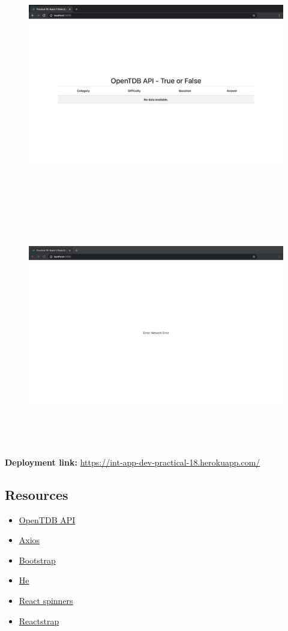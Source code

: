 \documentclass{article}
\begin{document}
\begin{figure}[H]
  \includegraphics[width=175mm, height=105mm]{./img/18-expected-opentdb-3.png}
  \includegraphics[width=175mm, height=105mm]{./img/18-expected-opentdb-4.png}
\end{figure}

\textbf{Deployment link:} \href{https://int-app-dev-practical-18.herokuapp.com/}{https://int-app-dev-practical-18.herokuapp.com/} 

\subsection*{Resources} 
\begin{itemize}
  \item \href{https://opentdb.com/}{OpenTDB API}
  \item \href{https://www.npmjs.com/package/axios/}{Axios}
  \item \href{https://getbootstrap.com/}{Bootstrap}
  \item \href{https://www.npmjs.com/package/he/}{He}
  \item \href{https://www.npmjs.com/package/react-spinners/}{React spinners}
  \item \href{https://www.npmjs.com/package/reactstrap/}{Reactstrap}
\end{itemize}
 
\end{document}

